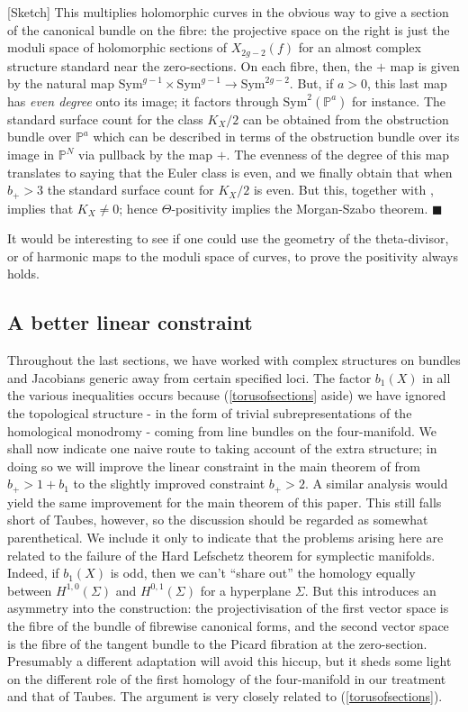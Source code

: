 \documentclass[10pt]{article}
\newcommand{\pp}{\mathbb{P}}
\newcommand{\Sym}{\mathrm{Sym}}
\newenvironment{Pf}{\par \noindent{\sc Proof:} }{\quad $\blacksquare$ \par
\vspace{0.5cm}}
\begin{document}
\begin{Pf}[Sketch]
\noindent This multiplies holomorphic curves in the obvious way to
give a section of the canonical bundle on the fibre: the projective
space on the right is just the moduli space of holomorphic sections of
$X_{2g-2}(f)$ for an almost complex structure standard near the
zero-sections.  On each fibre,
then, the $+$ map is given
by the natural map $\Sym^{g-1} \times \Sym^{g-1}
\rightarrow \Sym^{2g-2}$.  But, if $a>0$, this last map has \emph{even
  degree} onto its image;
it factors through $\Sym^2 (\pp^a)$ for instance.  The standard
surface count for the class $K_X/2$ can be obtained from the
obstruction bundle over $\pp^a$ which can be described in terms of the
obstruction bundle over its image in $\pp^N$ via pullback by the
map $+$.  The 
evenness of the degree of this map translates to saying that the Euler
class is even, and we finally obtain that when $b_+ > 3$ the standard
surface count for $K_X / 2$ is even.  But this, together with
\cite{SKDIS}, implies that $K_X \neq 0$; hence $\Theta$-positivity implies
the Morgan-Szabo theorem.  
\end{Pf}

\noindent It would be interesting to see if one could
use the geometry of the theta-divisor, or of harmonic maps to the
moduli space of curves, to prove the positivity always holds.


\subsection{A better linear constraint}

Throughout the last sections, we have worked with complex
structures on bundles and Jacobians generic away from certain specified
loci.  The factor $b_1 (X)$ in all the various inequalities
occurs because (\ref{torusofsections} aside) we have ignored the
topological structure -  in the form
of trivial subrepresentations of the homological monodromy - coming from
line bundles on the four-manifold.  We shall now indicate one naive route to
taking account of the extra structure; in doing so we will
improve the linear
constraint in the main theorem of \cite{SKDIS} from
$b_+ > 1+b_1$ to the slightly improved constraint $b_+ > 2$.  A similar
analysis would  yield the same improvement for the main theorem of this
paper.  This
still falls short of Taubes, however, so the discussion should be
regarded as somewhat parenthetical.  We include it only to indicate
that the problems arising here are related to the failure of the Hard
Lefschetz theorem for symplectic manifolds.  Indeed, if $b_1 (X)$ is odd, then
we can't ``share out'' the homology equally between $H^{1,0}(\Sigma)$
and $H^{0,1}(\Sigma)$ for a hyperplane $\Sigma$.  But this introduces
an asymmetry into the construction: the projectivisation of the first vector
space is the
fibre of the bundle of fibrewise canonical forms, and the second
vector space is the fibre of the tangent bundle to the Picard
fibration at the zero-section.  Presumably a different adaptation will
avoid this hiccup, but it sheds some light on the different role of
the first homology of the four-manifold in our treatment and that of Taubes.
The argument is very closely related to (\ref{torusofsections}).
\end{document}
